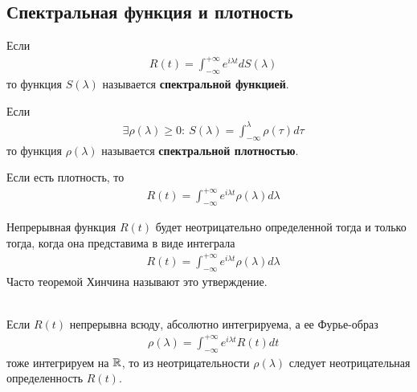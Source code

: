 \subsection{Спектральная функция и плотность}
\begin{Def}
    Если
    \begin{align*}
      & R(t) = \int_{-\infty}^{+\infty}e^{i\lambda t} dS(\lambda)
    \end{align*}
    то функция $S(\lambda)$ называется \textbf{спектральной функцией}.
\end{Def}
\begin{Def}
    Если
    \begin{align*}
      & \exists \rho(\lambda)\geq 0: \ S(\lambda) = \int_{-\infty}^{\lambda}\rho(\tau) d\tau
    \end{align*}
    то функция $\rho(\lambda)$ называется \textbf{спектральной плотностью}.
\end{Def}
Если есть плотность, то
\begin{align*}
  & R(t) = \int_{-\infty}^{+\infty}e^{i\lambda t} \rho(\lambda)d\lambda
\end{align*}
\begin{Note}
    Непрерывная функция $R(t)$ будет неотрицательно определенной тогда и только
    тогда, когда она представима в виде интеграла
    \begin{align*}
      & R(t) = \int_{-\infty}^{+\infty}e^{i\lambda t} \rho(\lambda) d\lambda
    \end{align*}
    Часто теоремой Хинчина называют это утверждение.
\end{Note}
\begin{Prop} ~
    \\
    Если $R(t)$ непрерывна всюду, абсолютно интегрируема, а ее Фурье-образ
    \begin{align*}
      & \rho(\lambda)= \int_{-\infty}^{+\infty}e^{i\lambda t} R(t) dt
    \end{align*}
    тоже интегрируем на $\mathbb{R}$, то из неотрицательности $\rho(\lambda)$ следует
    неотрицательная определенность $R(t)$.
\end{Prop}
